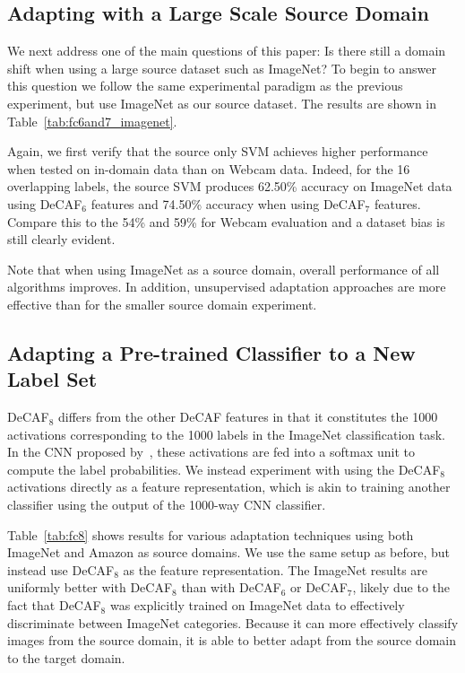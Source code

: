 \subsection{Adapting with a Large Scale Source Domain}

We next address one of the main questions of this paper: Is there still a domain shift when using a large source dataset such as ImageNet? To begin to answer this question we follow the same experimental paradigm as the previous experiment, but use ImageNet as our source dataset. 
The results are shown in Table~\ref{tab:fc6and7_imagenet}.


Again, we first verify that the source only SVM achieves higher performance when tested on in-domain data than on Webcam data. 
Indeed, for the 16 overlapping labels, the source SVM produces 62.50\% accuracy on ImageNet data using DeCAF$_6$ features and 74.50\% accuracy when using DeCAF$_7$ features. 
Compare this to the 54\% and 59\% for Webcam evaluation and a dataset bias is still clearly evident.

Note that when using ImageNet as a source domain, overall performance of all algorithms improves. In addition, unsupervised adaptation approaches are more effective than for the smaller source domain experiment. 



\subsection{Adapting a Pre-trained Classifier to a New Label Set }


DeCAF$_8$ differs from the other DeCAF features in that it constitutes the 1000
activations corresponding to the 1000 labels in the ImageNet classification
task. In the CNN proposed by~\cite{supervision}, these activations are fed into
a softmax unit to compute the label probabilities. We instead experiment with
using the DeCAF$_8$ activations directly as a feature representation, which is
akin to training another classifier using the output of the 1000-way CNN
classifier.

Table~\ref{tab:fc8} shows results for various adaptation techniques using both
ImageNet and Amazon as source domains. We use the same setup as before, but
instead use DeCAF$_8$ as the feature representation. 
The ImageNet results are uniformly better with DeCAF$_8$ than with DeCAF$_6$ or
DeCAF$_7$, likely due to the fact that DeCAF$_8$ was explicitly
trained on ImageNet data to effectively discriminate between ImageNet categories.
Because it can more
effectively classify images from the source domain, it is able to better adapt
from the source domain to the target domain.

